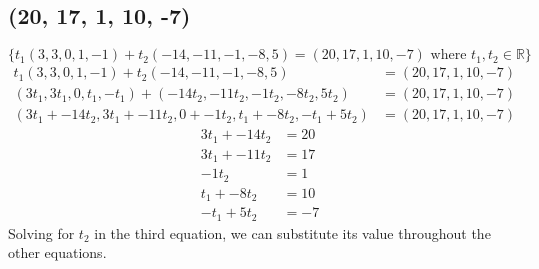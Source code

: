 \documentclass{article}
\begin{document}
\subsection{(20, 17, 1, 10, -7)}
$\{t_1(3,3,0,1,-1) + t_2(-14,-11,-1,-8,5) = (20, 17, 1, 10, -7) \text{ where } 
t_1,t_2 \in \mathbb{R}\}$\\
\begin{equation*}
\begin{split}
t_1(3,3,0,1,-1) + t_2(-14,-11,-1,-8,5) &= (20, 17, 1, 10,
-7)\\
(3t_1,3t_1,0,t_1,-t_1) + (-14t_2,-11t_2,-1t_2,-8t_2,5t_2) &= (20, 17, 1,
10, -7)\\
(3t_1 + -14t_2, 3t_1 + -11t_2, 0 + -1t_2, t_1 + -8t_2, -t_1 + 5t_2) &= (20, 17, 1,
10, -7)
\end{split}
\end{equation*}
\begin{equation*}
\begin{split}
3t_1 + -14t_2 &= 20\\
3t_1 + -11t_2 &= 17\\
-1t_2 &= 1\\
t_1 + -8t_2 &= 10\\
-t_1 + 5t_2 &= -7
\end{split}
\end{equation*}
Solving for $t_2$ in the third equation, we can substitute its value
throughout the other equations.\\
\end{document}
